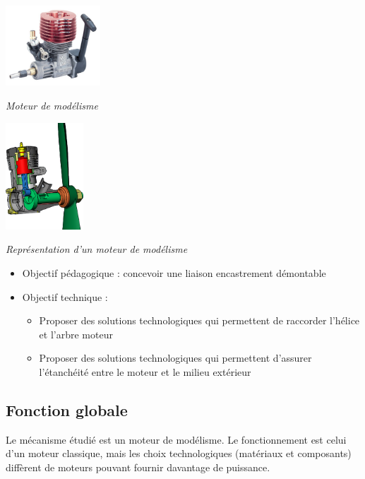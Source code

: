 \documentclass[11pt,oneside]{article}
\begin{document}
\begin{minipage}[c]{.45\linewidth}
\begin{center}
\includegraphics[height=3cm]{png/moteur}

\textit{Moteur de modélisme}
\end{center}
\end{minipage}\hfill
\begin{minipage}[c]{.45\linewidth}
\begin{center}
\includegraphics[height=4cm]{png/moteur_3D}

\textit{Représentation d'un moteur de modélisme}
\end{center}
\end{minipage}

\begin{contexte}
\begin{itemize}
\item Objectif pédagogique : concevoir une liaison encastrement démontable
\item Objectif technique : 
\begin{itemize}
\item Proposer des solutions technologiques qui permettent de raccorder l'hélice et l'arbre moteur
\item Proposer des solutions technologiques qui permettent d'assurer l'étanchéité entre le moteur et le milieu extérieur
\end{itemize}
\end{itemize}
\end{contexte}

\subsection*{Fonction globale}
Le mécanisme étudié est un moteur de modélisme. Le fonctionnement est celui d'un moteur classique, mais les choix technologiques (matériaux et composants) diffèrent de moteurs pouvant fournir davantage de puissance.
\end{document}
